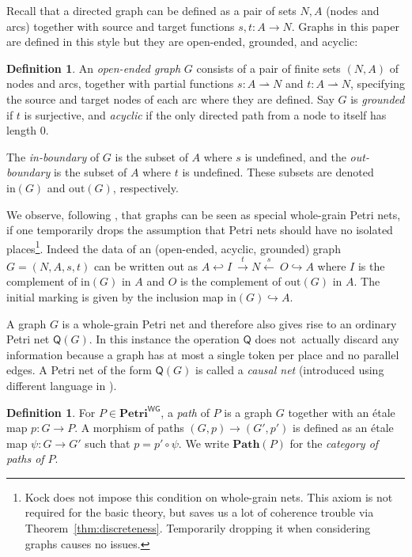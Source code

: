 \documentclass[11pt,a4paper]{article}
\theoremstyle{plain}
\theoremstyle{definition}
\newtheorem{definition}[theorem]{Definition}
\theoremstyle{remark}
\newcommand{\WGPetri}{\mathbf{Petri}^{\mathsf{WG}}}
\newcommand{\Q}{\mathsf{Q}}
\newcommand{\inb}{\mathrm{in}}
\newcommand{\outb}{\mathrm{out}}
\newcommand{\Path}{\mathbf{Path}}
\begin{document}
Recall that a directed graph can be defined as a pair of sets $N, A$ (nodes and arcs) together with source and target functions $s, t: A \to N$. Graphs in this paper are defined in this style but they are open-ended, grounded, and acyclic: 
\begin{definition}
  An \emph{open-ended graph} $G$ consists of a pair of finite sets $(N, A)$
  of nodes and arcs, together with partial functions $s : A \rightharpoonup N$ and $t : A \rightharpoonup N$,
  specifying the source and target nodes of each arc where they are defined. Say $G$ is \emph{grounded} if $t$ is surjective, and \emph{acyclic} if the only directed path from a node to itself has length 0. 

  The \emph{in-boundary} of $G$ is the subset of $A$ where $s$ is undefined, and
  the \emph{out-boundary} is the subset of $A$ where $t$ is undefined. These
  subsets are denoted $\inb(G)$ and $\outb(G)$, respectively.
\end{definition}

We observe, following \cite{WGPN}, that graphs can be seen as special whole-grain Petri nets, if one temporarily drops the assumption that Petri nets should have no isolated places\footnote{Kock \cite{WGPN} does not impose this condition on whole-grain nets. This axiom is not required for the basic theory, but saves us a lot of coherence trouble via Theorem~\ref{thm:discreteness}. Temporarily dropping it when considering graphs causes no issues.}.
Indeed the data of an (open-ended, acyclic, grounded) graph $G = (N, A, s, t)$ can be written out as $A \hookleftarrow I \ \xrightarrow{t} N \xleftarrow{s}\ O \hookrightarrow A$ where $I$ is the complement of $\inb(G)$ in $A$ and $O$ is the complement of $\outb(G)$ in $A$. The initial marking is given by the inclusion map $\inb(G) \hookrightarrow A$.








A graph $G$ is a whole-grain Petri net and therefore also gives rise to an ordinary Petri net $\Q(G)$. In this instance the operation $\Q$ does not actually discard any information because a graph has at most a single token per place and no parallel edges. A Petri net of the form $\Q(G)$ is called a \emph{causal net} (introduced using different language in \cite{ES1}).


\begin{definition}
  For $P \in \WGPetri$, a \emph{path} of $P$ is a graph $G$  together with an \'etale map $p : G \to P$. A morphism of paths $(G, p) \to (G', p')$
  is defined as an \'etale map $\psi : G \to G'$ such that $p = p' \circ \psi$. We
  write $\Path(P)$ for the \emph{category of paths of $P$}.
\end{definition} 
\end{document}
